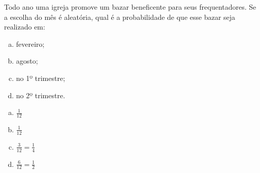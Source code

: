 \begin{ex}
 Todo ano uma igreja promove um bazar beneficente para seus frequentadores. Se a escolha do mês é aleatória, qual é a probabilidade de que esse bazar seja realizado em:
   \begin{enumerate}[(a)]
   \item fevereiro;
   \item agosto;
   \item no 1º trimestre;
   \item no 2º trimestre.
   \end{enumerate}
    \begin{sol}
     \phantom{A}
       \begin{enumerate} [(a)]
           \item $\frac{1}{12}$
           \item $\frac{1}{12}$
           \item $\frac{3}{12}=\frac{1}{4}$
           \item $\frac{6}{12}=\frac{1}{2}$
       \end{enumerate}
    \end{sol}
\end{ex}